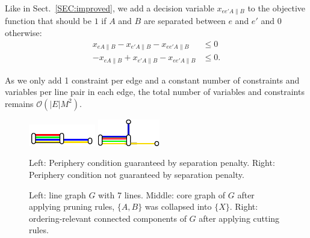\documentclass[sigconf]{acmart}
\begin{document}
Like in Sect.~\ref{SEC:improved}, we add a decision variable $x_{ee'A\|B}$ to the objective function that should be $1$ if $A$ and $B$ are separated between $e$ and $e'$ and $0$ otherwise:
\begin{align}
	x_{eA\|B} - x_{e'A\|B} - x_{ee'A\|B} &\leq 0 \\
	-x_{eA\|B} + x_{e'A\|B} - x_{ee'A\|B} &\leq 0.
\end{align}

As we only add 1 constraint per edge and a constant number of constraints and variables per line pair in each edge, the total number of variables and constraints remains $\mathcal{O}(|E|M^2)$.

\begin{figure}[b]
\centering
\begin{minipage}{.48\textwidth}
  \centering
  \includegraphics[trim={0 0.9 0 1.8},clip,width=.49\textwidth]{render_examples/periphery/periphery_example1.pdf}
  \hfill
  \includegraphics[width=.48\textwidth]{render_examples/periphery/periphery_example2.pdf}
  \caption{Left: Periphery condition guaranteed by separation penalty. Right: Periphery condition not guaranteed by separation penalty.}
  \label{FIG:periphery}
\end{minipage}
\end{figure}

\begin{figure}[t]
\centering
  
  \hfill
  
  \hfill
  
  \caption{Left: line graph $G$ with 7 lines. Middle: core graph of $G$ after applying pruning rules, $\{A, B\}$ was collapsed into $\{X\}$. Right: ordering-relevant connected components of $G$ after applying cutting rules.}
  \label{FIG:coreoptimgraph}
\end{figure}
\end{document}
